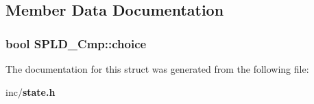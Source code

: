 \subsection{Member Data Documentation}
\subsubsection{\setlength{\rightskip}{0pt plus 5cm}bool {\bf SPLD\_\-Cmp::choice}}\label{structSPLD__Cmp_9566f4b0879a98e641c4b5a0dc93cfd9}




The documentation for this struct was generated from the following file:\begin{CompactItemize}
\item 
inc/{\bf state.h}\end{CompactItemize}
